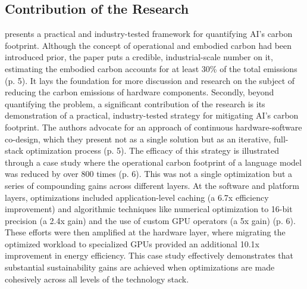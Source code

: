 \documentclass[a4paper, 12pt]{article}
\begin{document}
\subsection{Contribution of the Research}
\citet{Wu2022} presents a practical and industry-tested framework for quantifying AI's carbon footprint. Although the concept of operational and embodied carbon had been introduced prior, the paper puts a credible, industrial-scale number on it, estimating the embodied carbon accounts for at least 30\% of the total emissions (p. 5). It lays the foundation for more discussion and research on the subject of reducing the carbon emissions of hardware components. Secondly, beyond quantifying the problem, a significant contribution of the research is its demonstration of a practical, industry-tested strategy for mitigating AI's carbon footprint. The authors advocate for an approach of continuous hardware-software co-design, which they present not as a single solution but as an iterative, full-stack optimization process (p. 5). The efficacy of this strategy is illustrated through a case study where the operational carbon footprint of a language model was reduced by over 800 times (p. 6). This was not a single optimization but a series of compounding gains across different layers. At the software and platform layers, optimizations included application-level caching (a 6.7x efficiency improvement) and algorithmic techniques like numerical optimization to 16-bit precision (a 2.4x gain) and the use of custom GPU operators (a 5x gain) (p. 6). These efforts were then amplified at the hardware layer, where migrating the optimized workload to specialized GPUs provided an additional 10.1x improvement in energy efficiency. This case study effectively demonstrates that substantial sustainability gains are achieved when optimizations are made cohesively across all levels of the technology stack.
\end{document}
